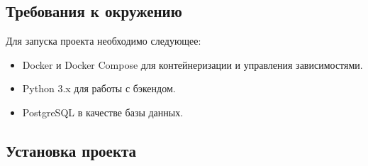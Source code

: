 \hypertarget{ux442ux440ux435ux431ux43eux432ux430ux43dux438ux44f-ux43a-ux43eux43aux440ux443ux436ux435ux43dux438ux44e}{%
\subsection*{Требования к
окружению}\label{ux442ux440ux435ux431ux43eux432ux430ux43dux438ux44f-ux43a-ux43eux43aux440ux443ux436ux435ux43dux438ux44e}}

Для запуска проекта необходимо следующее: 
\begin{itemize}
    \item 
Docker и
Docker Compose для контейнеризации и управления зависимостями.
    \item
Python 3.x для работы с бэкендом. 
    \item
PostgreSQL в
качестве базы данных.
\end{itemize}
\hypertarget{ux443ux441ux442ux430ux43dux43eux432ux43aux430-ux43fux440ux43eux435ux43aux442ux430}{%
\subsection*{Установка
проекта}\label{ux443ux441ux442ux430ux43dux43eux432ux43aux430-ux43fux440ux43eux435ux43aux442ux430}}

